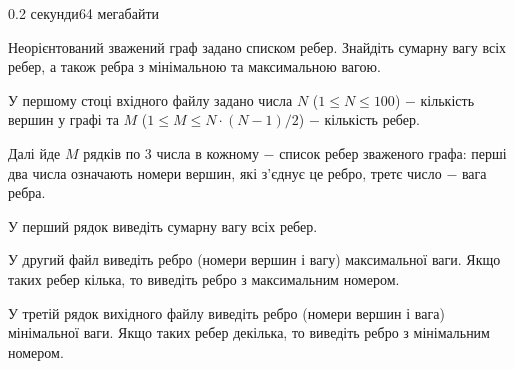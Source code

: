 \begin{problem}{}{}{}{0.2 секунди}{64 мегабайти}

Неорієнтований зважений граф задано списком ребер. Знайдіть сумарну вагу всіх ребер, а також ребра з мінімальною та максимальною вагою.

\InputFile
У першому стоці вхідного файлу задано числа $N$ ($1 \le N \le 100$) $-$ кількість вершин у графі та $M$ ($1 \le M \le N\cdot(N-1)/2$) $-$ кількість ребер.

Далі йде $M$ рядків по $3$ числа в кожному $-$ список ребер зваженого графа: перші два числа означають номери вершин, які з'єднує це ребро, третє число $-$ вага ребра.
 
\OutputFile
У перший рядок виведіть сумарну вагу всіх ребер.

У другий файл виведіть ребро (номери вершин і вагу) максимальної ваги. 
Якщо таких ребер кілька, то виведіть ребро з максимальним номером.

У третій рядок вихідного файлу виведіть ребро (номери вершин і вага) мінімальної ваги. 
Якщо таких ребер декілька, то виведіть ребро з мінімальним номером.

\Example

\begin{example}
%
\end{example}

\end{problem}
